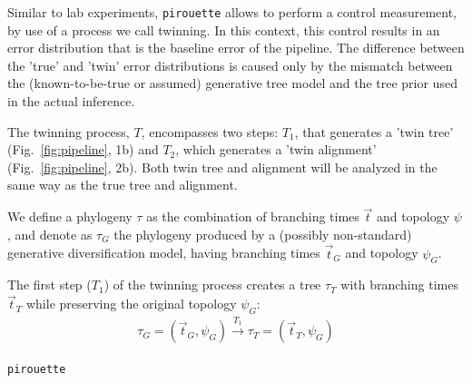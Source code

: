 Similar to lab experiments, \verb;pirouette; allows to perform
a control measurement, by use of a process we call twinning. 
In this context, this control results in an error distribution
that is the baseline error of the pipeline. The difference
between the 'true' and 'twin' error distributions is caused only
by the mismatch between the (known-to-be-true or assumed) 
generative tree model and the 
tree prior used in the actual inference.

The twinning process, $T$, encompasses two steps:
$T_1$, that generates a 'twin tree' (Fig.~\ref{fig:pipeline}, 1b) 
and $T_2$, which generates a 'twin alignment' (Fig.~\ref{fig:pipeline}, 2b).
Both twin tree and alignment will be analyzed in the same way 
as the true tree and alignment.

We define a phylogeny $\tau$ as the combination of
branching times $\Vec{t}$ and topology $\psi$, 
and denote as $\tau_{\mathit{G}}$ the phylogeny 
produced by a (possibly non-standard) generative diversification model, 
having branching times $\Vec{t}_{\mathit{G}}$ and 
topology $\psi_{\mathit{G}}$.

The first step ($T_1$) of the twinning process creates a tree $\tau_{\mathit{T}}$
with branching times $\Vec{t}_{\mathit{T}}$ while preserving the original
topology $\psi_{\mathit{G}}$:
\begin{align}
  \tau_{\mathit{G}} = (\Vec{t}_{\mathit{G}}, \psi_{\mathit{G}}) 
  \xrightarrow[]{\mathit{T_1}} 
  \tau_{\mathit{T}} = (\Vec{t}_{\mathit{T}}, \psi_{\mathit{G}})
\end{align}

\verb;pirouette;

